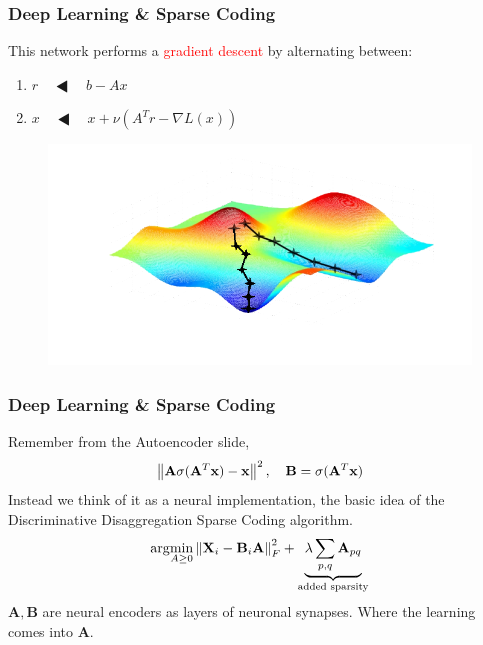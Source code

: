 \documentclass{beamer}              %
\begin{document}
\begin{frame}
	\frametitle{Deep Learning \& Sparse Coding}
	This network performs a \textcolor{red}{gradient descent} by alternating between:
	\begin{enumerate}
		\item { $  r \quad \LHD \quad b - Ax$}
		\item{$ x \quad  \LHD \quad  x + \nu (A^T r - \nabla L(x))$}
	\end{enumerate}
	
	\begin{figure}
		\includegraphics[scale=.5]{./figures/gradient_descent_transparent.png}
	\end{figure}
\end{frame}

\begin{frame}
	\frametitle{Deep Learning \& Sparse Coding}
	
	Remember from the Autoencoder slide,
	\begin{equation*}
	\label{eq:auto}
	\left\lVert\mathbf{A}\sigma(\mathbf{A}^T \mathbf{x}) - \mathbf{x}\right\rVert^2, \quad
	\mathbf{B} = \sigma(\mathbf{A}^T \mathbf{x})
	\end{equation*}
	Instead we think of it as a neural implementation, the basic idea of the Discriminative Disaggregation Sparse Coding algorithm.
	\begin{equation*}
	\arg \! \min_{A \geq 0} \left\lVert\mathbf{X}_i - \mathbf{B}_i\mathbf{A}\right\rVert_F^2 + \underbrace{\lambda \sum_{p,q} \mathbf{A}_{pq}}_{\text{added sparsity}}
	\end{equation*}
	$\mathbf{A},\mathbf{B}$ are neural encoders as layers of neuronal synapses. Where the learning comes into $\mathbf{A}$.
\end{frame}
\end{document}
